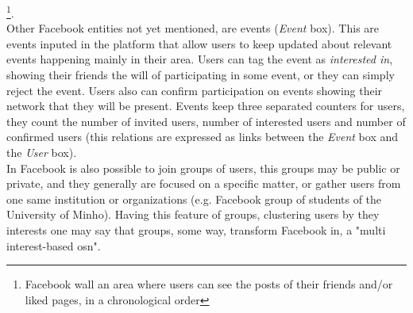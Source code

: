 \footnote{Facebook wall an area where users can see the posts of their friends and/or liked pages, in a chronological order}.\\
\indent Other Facebook entities not yet mentioned, are events (\textit{Event} box). This are events inputed in the platform that allow
users to keep updated about relevant events happening mainly in their area. Users can tag the event as \textit{interested in}, showing their friends
the will of participating in some event, or they can simply reject the event. Users also can confirm participation on events
showing their network that they will be present. Events keep three separated counters for users, they count the number of invited users, number of
interested users and number of confirmed users (this relations are expressed as links between the \textit{Event} box and the \textit{User} box).\\
\indent In Facebook is also possible to join groups of users, this groups may be public or private, and they generally are focused on a specific matter,
or gather users from one same institution or organizations (e.g. Facebook group of students of the University of Minho).
Having this feature of groups, clustering users by they interests one may say that groups, some way, transform Facebook in, a "multi interest-based \gls{osn}".

